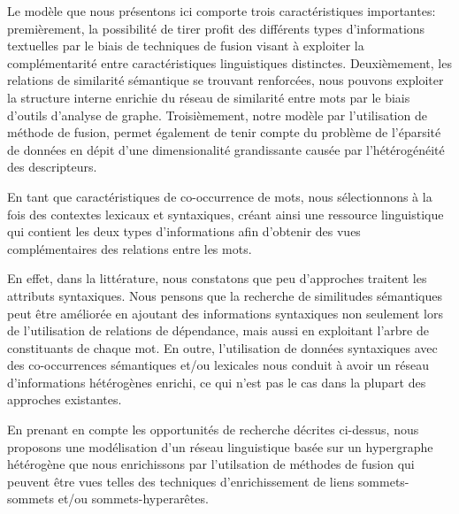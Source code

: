 \documentclass[a4paper,11pt,twoside]{article}
\begin{document}
Le modèle que nous présentons ici comporte trois caractéristiques importantes: premièrement, la possibilité de tirer profit des différents types d'informations textuelles par le biais de techniques de fusion visant à exploiter la complémentarité entre caractéristiques linguistiques distinctes. Deuxièmement, les relations de similarité sémantique se trouvant renforcées, nous pouvons exploiter la structure interne enrichie du réseau de similarité entre mots par le biais d'outils d'analyse de graphe. Troisièmement, notre modèle par l'utilisation de méthode de fusion, permet également de tenir compte du problème de l'éparsité de données en dépit d'une dimensionalité grandissante causée par l'hétérogénéité des descripteurs. 

En tant que caractéristiques de co-occurrence de mots, nous sélectionnons à la fois des contextes lexicaux et syntaxiques, créant ainsi une ressource linguistique qui contient les deux types d'informations afin d'obtenir des vues complémentaires des relations entre les mots.

%

En effet, dans la littérature, nous constatons que peu d'approches traitent les attributs syntaxiques. Nous pensons que la recherche de similitudes sémantiques peut être améliorée en ajoutant des informations syntaxiques non seulement lors de l'utilisation de relations de dépendance, mais aussi en exploitant l'arbre de constituants de chaque mot. En outre, l'utilisation de données syntaxiques avec des co-occurrences sémantiques et/ou lexicales nous conduit à avoir un réseau d'informations hétérogènes enrichi, ce qui n'est pas le cas dans la plupart des approches existantes.

En prenant en compte les opportunités de recherche décrites ci-dessus, nous proposons une modélisation  d'un réseau linguistique basée sur un hypergraphe hétérogène que nous enrichissons par l'utilsation de méthodes de fusion qui peuvent être vues telles des techniques d'enrichissement de liens sommets-sommets et/ou sommets-hyperarêtes.
\end{document}
